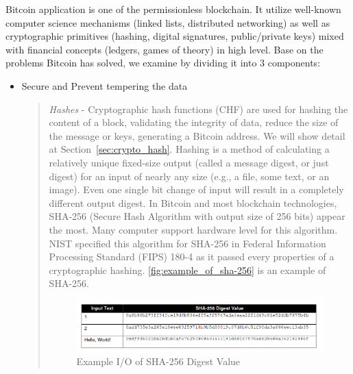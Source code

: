 Bitcoin application is one of the permissionless blockchain.
It utilize well-known computer science mechanisms (linked lists, distributed networking) as well as cryptographic primitives (hashing, digital signatures, public/private keys) mixed with financial concepts (ledgers, games of theory) in high level.
Base on the problems Bitcoin has solved, we examine by dividing it into 3 components:

\begin{itemize}
  \item Secure and Prevent tempering the data

        \begin{quote}
          \emph{Hashes} -
          Cryptographic hash functions (CHF) are used for hashing the content of a block, validating the integrity of data, reduce the size of the message or keys, generating a Bitcoin address. We will show detail at Section~\ref{sec:crypto_hash}.
          Hashing is a method of calculating a relatively unique fixed-size output (called a message digest, or just digest) for an input of nearly any size (e.g., a file, some text, or an image).
          Even one single bit change of input will result in a completely different output digest.
          In Bitcoin and most blockchain technologies, SHA-256 (Secure Hash Algorithm with output size of 256 bits) appear the most. Many computer support hardware level for this algorithm.
          NIST specified this algorithm for SHA-256 in Federal Information Processing Standard (FIPS) 180-4 as it passed every properties of a cryptographic hashing.
          \autoref{fig:example_of_sha-256} is an example of SHA-256.

          \begin{figure}[ht!]
            \centering
            \includegraphics[width=1\textwidth]{images/example_of_sha-256.png}
            \caption[Example input and output of SHA-256 Digest Value]{Example I/O of SHA-256 Digest Value}
            \label{fig:example_of_sha-256}
          \end{figure}

          \bigbreak


\end{quote}
\end{itemize}

